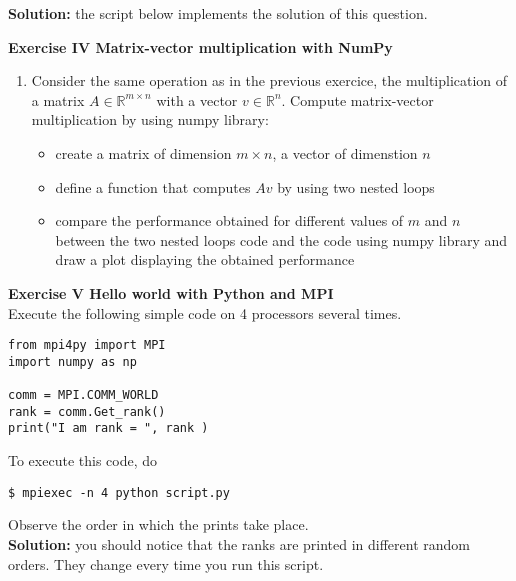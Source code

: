 \documentclass[11pt]{article}
\begin{document}
\textbf{Solution: } the script below implements the solution of this question.


\bigskip

\bigskip

{\bf{Exercise IV Matrix-vector multiplication with NumPy}}\\
\begin{enumerate}
\item Consider the same operation as in the previous exercice, the
  multiplication of a matrix $A \in \mathbb{R}^{m \times n}$ with a
  vector $v \in \mathbb{R}^n$.  Compute matrix-vector multiplication by using numpy library:
\begin{itemize}
\item create a matrix of dimension $m \times n$, a vector of dimenstion $n$
\item define a function that computes $A v$ by using two nested loops
\item compare the performance obtained for different values of $m$ and $n$ between the two nested loops code and the code using numpy library and draw a plot displaying the obtained performance
\end{itemize}
\end{enumerate}

{\bf{Exercise V Hello world with Python and MPI}}\\
Execute the following simple code on 4 processors several times. 
\begin{verbatim}
from mpi4py import MPI 
import numpy as np  

comm = MPI.COMM_WORLD
rank = comm.Get_rank()
print("I am rank = ", rank )
\end{verbatim}
To execute this code, do
\begin{verbatim}
$ mpiexec -n 4 python script.py
\end{verbatim}
Observe the order in which the prints take place. \\

\textbf{Solution: } you should notice that the ranks are printed in different random orders. They change every time you run this script.
\end{document}
